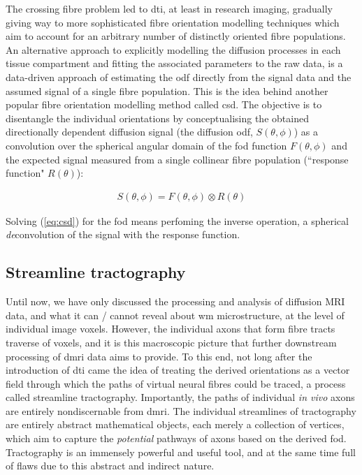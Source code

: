 The crossing fibre problem led to \gls{dti}, at least in research imaging, gradually giving way to more sophisticated fibre orientation modelling techniques which aim to account for an arbitrary number of distinctly oriented fibre populations.
An alternative approach to explicitly modelling the diffusion processes in each tissue compartment and fitting the associated parameters to the raw data, is a data-driven  approach of estimating the \gls{odf} directly from the signal data and the assumed signal of a single fibre population.
This is the idea behind another popular fibre orientation modelling method called \gls{csd}.
The objective is to disentangle the individual orientations by conceptualising the obtained directionally dependent diffusion signal (the diffusion \gls{odf}, $S(\theta,\phi)$) as a convolution over the spherical angular domain of the \gls{fod} function $F(\theta,\phi)$ and the expected signal measured from a single collinear fibre population (``response function" $R(\theta)$):

\begin{align}
  S(\theta,\phi) = F(\theta,\phi) \otimes R(\theta)
\end{align}\label{eq:csd}

Solving (\ref{eq:csd}) for the \gls{fod} means perfoming the inverse operation, a spherical \textit{de}convolution of the signal with the response function.

\subsection{Streamline tractography}


Until now, we have only discussed the processing and analysis of diffusion MRI data, and what it can / cannot reveal about \gls{wm} microstructure, at the level of individual image \glspl{voxel}.
However, the individual axons that form fibre tracts traverse  of voxels, and it is this macroscopic picture that further downstream processing of \gls{dmri} data aims to provide.
To this end, not long after the introduction of \gls{dti} came the idea of treating the derived orientations as a vector field through which the paths of virtual neural fibres could be traced, a process called streamline tractography.
Importantly, the paths of individual \textit{in vivo} axons are entirely nondiscernable from \gls{dmri}.
The individual streamlines of tractography are entirely abstract mathematical objects, each merely a collection of vertices, which aim to capture the \textit{potential} pathways of axons based on the derived \gls{fod}.
Tractography is an immensely powerful and useful tool, and at the same time full of flaws  due to this abstract and indirect nature.

